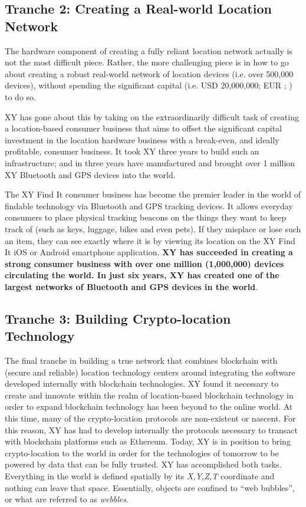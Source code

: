 \documentclass{article}
\begin{document}
\subsection{Tranche 2: Creating a Real-world Location Network}
The hardware component of creating a fully reliant location network actually is not the most difficult piece. Rather, the more challenging piece is in how to go about creating a robust real-world network of location devices (i.e. over 500,000 devices), without spending the  significant capital (i.e. USD 20,000,000; EUR ; ) to do so.

XY has gone about this by taking on the extraordinarily difficult task of creating a location-based consumer business that aims to offset the significant capital investment in the location hardware business with a break-even, and ideally profitable, consumer business. It took XY three years to build such an infrastructure; and in three years have manufactured and brought over 1 million XY Bluetooth and GPS devices into the world.

The XY Find It consumer business has become the premier leader in the world of findable technology via Bluetooth and GPS tracking devices. It allows everyday consumers to place physical tracking beacons on the things they want to keep track of (such as keys, luggage, bikes and even pets). If they misplace or lose such an item, they can see exactly where it is by viewing its location on the XY Find It iOS or Android smartphone application. \textbf{XY has succeeded in creating a strong consumer business with over one million (1,000,000) devices circulating the world. In just six years, XY has created one of the largest networks of Bluetooth and GPS devices in the world}.

\subsection{Tranche 3: Building Crypto-location Technology}
The final tranche in building a true network that combines blockchain with (secure and reliable) location technology centers around integrating the software developed internally with blockchain technologies. XY found it necessary to create and innovate within the realm of location-based blockchain technology in order to expand blockchain technology has been beyond to the online world. At this time, many of the crypto-location protocols are non-existent or nascent. For this reason, XY has had to develop internally the protocols necessary to transact with blockchain platforms such as Ethereum. Today, XY is in position to bring crypto-location to the world in order for the technologies of tomorrow to be powered by data that can be fully trusted. XY has accomplished both tasks.
Everything in the world is defined spatially by its \textit{X,Y,Z,T} coordinate and nothing can leave that space. Essentially, objects are confined to ``web bubbles'', or what are referred to as \textit{webbles}. 
\end{document}

